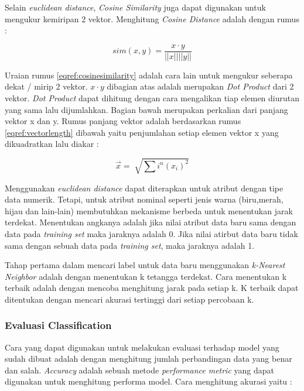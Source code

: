 Selain \textit{euclidean distance}, \textit{Cosine Similarity} juga dapat digunakan untuk mengukur kemiripan 2 vektor. Menghitung \textit{Cosine Distance} adalah dengan rumus : 

\begin{equation}
   sim(x,y)  = \frac{x \cdot y}{||x|| ||y||}
   \label{eqref:cosinesimilarity}
\end{equation}

Uraian rumus \eqref{eqref:cosinesimilarity} adalah cara lain untuk mengukur seberapa dekat / mirip 2 vektor. $x \cdot y$ dibagian atas adalah merupakan \textit{Dot Product} dari 2 vektor. \textit{Dot Product} dapat dihitung dengan cara mengalikan tiap elemen diurutan yang sama lalu dijumlahkan. Bagian bawah merupakan perkalian dari panjang vektor x dan y. Rumus panjang vektor adalah berdasarkan rumus \eqref{eqref:vectorlength} dibawah yaitu penjumlahan setiap elemen vektor x yang dikuadratkan lalu diakar :

\begin{equation}
  \vec{x} = \sqrt[]{\sum{i}^{n} (x_i)^2}
  \label{eqref:vectorlength}
\end{equation}


Menggunakan \textit{euclidean distance} dapat diterapkan untuk atribut dengan tipe data numerik. Tetapi, untuk atribut nominal seperti jenis warna (biru,merah, hijau dan lain-lain) membutuhkan mekanisme berbeda untuk menentukan jarak terdekat. Menentukan angkanya adalah jika nilai atribut data baru sama dengan data pada \textit{training set} maka jaraknya adalah 0. Jika nilai atirbut data baru tidak sama dengan sebuah data pada \textit{training set}, maka jaraknya adalah 1. 

Tahap pertama dalam mencari label untuk data baru menggunakan \textit{k-Nearest Neighbor} adalah  dengan menentukan k tetangga terdekat. Cara menentukan k terbaik adalah dengan mencoba menghitung jarak pada setiap k. K terbaik dapat ditentukan dengan mencari akurasi tertinggi dari setiap percobaan k.

 
\subsubsection{Evaluasi Classification} 
Cara yang dapat digunakan untuk melakukan evaluasi terhadap model yang sudah dibuat adalah dengan menghitung jumlah perbandingan data yang benar dan salah. \textit{Accuracy} adalah sebuah metode \textit{performance metric} yang dapat digunakan untuk menghitung performa model. Cara menghitung akurasi yaitu : 

